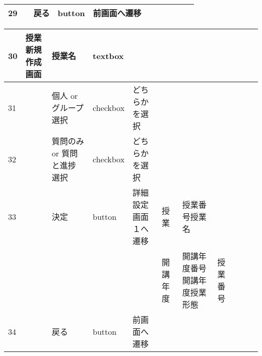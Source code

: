 \begin{table}[]
\begin{tabular}{|l|l|l|l|l|l|l|l|l|l|l|}
29  &               & 戻る               & button   & 前画面へ遷移                                                            &         &                       &                    &                 &                               &                                                                \\ \hline
\end{tabular}
\end{table}



\newpage
\begin{table}[]
\centering
\begin{tabular}{|l|l|l|l|l|l|l|l|l|l|l|}
\hline
30  & 授業新規作成画面      & 授業名              & textbox  &                                                                   &         &                       &                    &                 &                               &                                                                \\ \hline
31  &               & 個人 or グループ　選択    & checkbox & どちらかを選択                                                           &         &                       &                    &                 &                               &                                                                \\ \hline
32  &               & 質問のみ or 質問と進捗　選択 & checkbox & どちらかを選択                                                           &         &                       &                    &                 &                               &                                                                \\ \hline
33  &               & 決定               & button   & 詳細設定画面１へ遷移                                                        & 授業      & 授業番号授業名               &                    &                 &                               &                                                                \\ \hline
    &               &                  &          &                                                                   & 開講年度    & 開講年度番号開講年度授業形態        & 授業番号               &                 &                               &                                                                \\ \hline
34  &               & 戻る               & button   & 前画面へ遷移                                                            &         &                       &                    &                 &                               &                                                                \\ \hline

\end{tabular}
\end{table}
